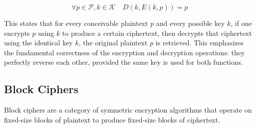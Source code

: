 \documentclass[12pt]{article}
\begin{document}
\[
\forall p \in \mathcal{P}, k \in \mathcal{K} \quad D(k, E(k, p)) = p
\]

This states that for every conceivable plaintext \( p \) and every possible key \( k \), if one encrypts \( p \) using \( k \) to produce a certain ciphertext, then decrypts that ciphertext using the identical key \( k \), the original plaintext \( p \) is retrieved. This emphasizes the fundamental correctness of the encryption and decryption operations: they perfectly reverse each other, provided the same key is used for both functions.

\subsection*{Block Ciphers}

Block ciphers are a category of symmetric encryption algorithms that operate on fixed-size blocks of plaintext to produce fixed-size blocks of ciphertext. 
\end{document}
